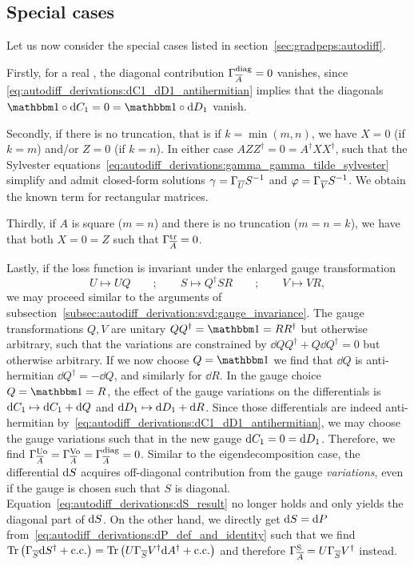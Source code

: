 \subsection{Special cases}
\label{subsec:autodiff_derivation:svd:special_cases}

Let us now consider the special cases listed in section~\ref{sec:gradpeps:autodiff}.

Firstly, for a real , the diagonal contribution $\Gamma_{\overline{A}}^\mathrm{diag} = 0$ vanishes, since \eqref{eq:autodiff_derivations:dC1_dD1_antihermitian} implies that the diagonals $\eye\hadamard\dC_1 = 0 = \eye\hadamard\dD_1$ vanish.


Secondly, if there is no truncation, that is if $k = \min(m, n)$, we have $X=0$ (if $k=m$) and/or $Z=0$ (if $k=n$). In either case $A Z Z^\dagger = 0 = A^\dagger X X^\dagger$, such that the Sylvester equations~\eqref{eq:autodiff_derivations:gamma_gamma_tilde_sylvester} simplify and admit closed-form solutions $\gamma = \Gamma_{\overline{U}}S^{-1}$ and $\varphi = \Gamma_{\overline{V}}S^{-1}$. We obtain the known  term for rectangular matrices.


Thirdly, if $A$ is square ($m = n$) and there is no truncation ($m = n = k$), we have that both $X = 0 = Z$ such that $\Gamma_{\overline{A}}^\mathrm{tr} = 0$.


Lastly, if the loss function is invariant under the enlarged gauge transformation
\begin{equation}
    U \mapsto U Q 
    \qquad ; \qquad
    S \mapsto Q^\dagger S R
    \qquad ; \qquad
    V \mapsto V R
    ,
\end{equation}
we may proceed similar to the arguments of subsection~\ref{subsec:autodiff_derivation:svd:gauge_invariance}.
%
The gauge transformations $Q, V$ are unitary $Q Q^\dagger = \eye = R R^\dagger$ but otherwise arbitrary, such that the variations are constrained by $\dd Q Q^\dagger + Q \dd Q^\dagger = 0$ but otherwise arbitrary. If we now choose $Q = \eye$ we find that $\dd Q$ is anti-hermitian $\dd Q^\dagger = - \dd Q$, and similarly for $\dd R$.
%
In the gauge choice $Q = \eye = R$, the effect of the gauge variations on the differentials is $\mathrm{d}{C}_1 \mapsto \mathrm{d}{C}_1 + \mathrm{d} Q$ and $\mathrm{d}{D}_1 \mapsto \mathrm{d}{D}_1 + \mathrm{d} R$.
%
Since those differentials are indeed anti-hermitian by~\eqref{eq:autodiff_derivations:dC1_dD1_antihermitian}, we may choose the gauge variations such that in the new gauge $\mathrm{d}{C}_1 = 0 = \mathrm{d}{D}_1$.
%
Therefore, we find $\Gamma_{\overline{A}}^\mathrm{Uo} = \Gamma_{\overline{A}}^\mathrm{Vo} = \Gamma_{\overline{A}}^\mathrm{diag} = 0$.
%
Similar to the eigendecomposition case, the differential $\mathrm{d}{S}$ acquires off-diagonal contribution from the gauge \emph{variations}, even if the gauge is chosen such that $S$ is diagonal.
%
Equation~\eqref{eq:autodiff_derivations:dS_result} no longer holds and only yields the diagonal part of $\mathrm{d}{S}$.
%
On the other hand, we directly get $\mathrm{d}{S} = \mathrm{d}{P}$ from~\eqref{eq:autodiff_derivations:dP_def_and_identity} such that we find $\mathrm{Tr}\left( {\Gamma_{\overline{S}} \mathrm{d}{S}^\dagger + \mathrm{c.c.}} \right) = \mathrm{Tr}\left( {U \Gamma_{\overline{S}} V^\dagger \mathrm{d}{A}^\dagger + \mathrm{c.c.}} \right)$ and therefore $\Gamma_{\overline{A}}^\mathrm{S} = U \Gamma_{\overline{S}} V^\dagger$ instead.
